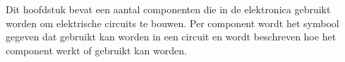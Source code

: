 Dit hoofdstuk bevat een aantal componenten die in de elektronica gebruikt worden om elektrische circuits te bouwen. Per component wordt het symbool gegeven dat gebruikt kan worden in een circuit en wordt beschreven hoe het component werkt of gebruikt kan worden.
